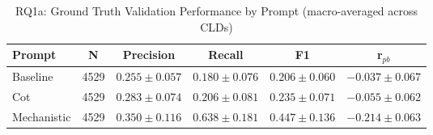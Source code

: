 \begin{table}[htbp]
\centreing
\caption{RQ1a: Ground Truth Validation Performance by Prompt (macro-averaged across CLDs)}
\label{tab:rq1a_gt_by_prompt}
\begin{tabular}{lccccc}
\toprule
\textbf{Prompt} & \textbf{N} & \textbf{Precision} & \textbf{Recall} & \textbf{F1} & \textbf{r$_{pb}$} \\
\midrule
Baseline & 4529 & $0.255 \pm 0.057$ & $0.180 \pm 0.076$ & $0.206 \pm 0.060$ & $-0.037 \pm 0.067$ \\
Cot & 4529 & $0.283 \pm 0.074$ & $0.206 \pm 0.081$ & $0.235 \pm 0.071$ & $-0.055 \pm 0.062$ \\
Mechanistic & 4529 & $0.350 \pm 0.116$ & $0.638 \pm 0.181$ & $0.447 \pm 0.136$ & $-0.214 \pm 0.063$ \\
\bottomrule
\end{tabular}
\end{table}